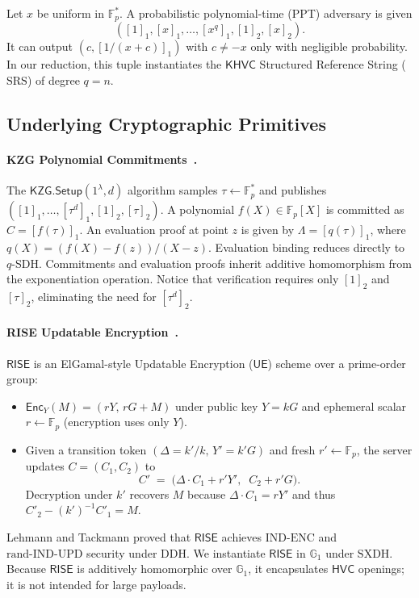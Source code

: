 \begin{assumption}
\label{assump:qsdh}
Let $x$ be uniform in $\mathbb{F}_p^*$. A probabilistic polynomial-time (PPT) adversary is given
\[
([1]_1, [x]_1, \dots, [x^q]_1, [1]_2, [x]_2).
\]
It can output $(c,[1/(x+c)]_1)$ with $c\neq -x$ only with negligible probability.
In our reduction, this tuple instantiates the $\mathsf{KHVC}$ Structured Reference String ($\mathrm{SRS}$) of degree $q = n$.
\end{assumption}

\subsection{Underlying Cryptographic Primitives}

\paragraph{KZG Polynomial Commitments~\cite{KZG10}.}
The $\mathsf{KZG.Setup}(1^\lambda, d)$ algorithm samples $\tau \leftarrow \mathbb{F}_p^*$ and publishes $([1]_1, \dots, [\tau^d]_1, [1]_2, [\tau]_2)$. 
A polynomial $f(X) \in \mathbb{F}_p[X]$ is committed as $C = [f(\tau)]_1$. 
An evaluation proof at point $z$ is given by $\Lambda = [q(\tau)]_1$, where $q(X) = (f(X) - f(z)) / (X - z)$. 
Evaluation binding reduces directly to $q$-SDH. 
Commitments and evaluation proofs inherit additive homomorphism from the exponentiation operation.
Notice that verification requires only $[1]_2$ and $[\tau]_2$, eliminating the need for $[\tau^d]_2$.


\paragraph{RISE Updatable Encryption~\cite{LT18}.}
$\mathsf{RISE}$ is an ElGamal-style Updatable Encryption ($\mathsf{UE}$) scheme over a prime-order group:
\begin{itemize}
    \item $\mathsf{Enc}_Y(M) = (rY,\, rG + M)$ under public key $Y = kG$ and ephemeral scalar $r \leftarrow \mathbb{F}_p$ (encryption uses only $Y$).
    \item Given a transition token $(\Delta = k'/k,\, Y' = k'G)$ and fresh $r'\leftarrow\mathbb{F}_p$, the server updates $C=(C_1,C_2)$ to
    \[
      C' \;=\; \bigl(\Delta\cdot C_1 + r'Y',\;\; C_2 + r'G\bigr).
    \]
    Decryption under $k'$ recovers $M$ because $\Delta\cdot C_1 = rY'$ and thus $C'_2 - (k')^{-1}C'_1 = M$.
\end{itemize}
Lehmann and Tackmann proved that $\mathsf{RISE}$ achieves $\mathrm{IND\text{-}ENC}$ and $\mathrm{rand\text{-}IND\text{-}UPD}$ security under $\mathrm{DDH}$.
We instantiate $\mathsf{RISE}$ in $\mathbb{G}_1$ under $\mathrm{SXDH}$.
Because $\mathsf{RISE}$ is additively homomorphic over $\mathbb{G}_1$, it encapsulates $\mathsf{HVC}$ openings; it is not intended for large payloads.

